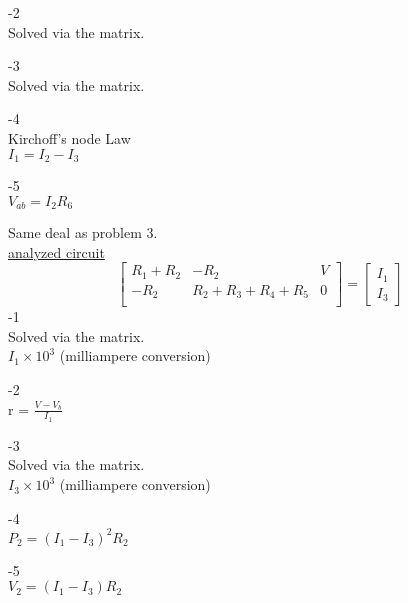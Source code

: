 \documentclass{article}
\begin{document}
-2 \\
Solved via the matrix. \\
\vspace{2mm}

-3 \\
Solved via the matrix. \\
\vspace{2mm}

-4 \\
Kirchoff's node Law \\
$I_1=I_2-I_3$ \\
\vspace{2mm}

-5 \\
$V_{ab}=I_2R_6$ \\
\vspace{2mm}

\noindent
Same deal as problem 3. \\
\href{https://i.imgur.com/MnsQ44k.png}{analyzed circuit}
\[
    \left[\begin{array}{cc|c}
    R_1+R_2& -R_2&V\\
    -R_2&R_2+R_3+R_4+R_5&0\\
      \end{array}\right]=
      \begin{bmatrix}
        I_1\\I_3
      \end{bmatrix}
\]
-1 \\
Solved via the matrix. \\
$I_1\times 10^{3}$ (milliampere conversion) \\
\vspace{2mm}

-2 \\
r = $\frac{V - V_b}{I_1}$
\vspace{2mm}

-3 \\
Solved via the matrix. \\
$I_3\times 10^{3}$ (milliampere conversion) \\
\vspace{2mm}

-4 \\
$P_2=(I_1-I_3)^2R_2$ \\
\vspace{2mm}

-5 \\
$V_2=(I_1-I_3)R_2$ 
\end{document}
